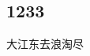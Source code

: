 \documentclass{article}
\begin{document}
\begin{CJK*}{GBK}{song}

\section{\textbf{1233}}

大江东去浪淘尽

\end{CJK*}
\end{document}

